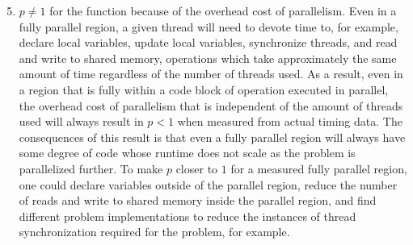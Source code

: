 \documentclass[11pt]{article}
\begin{document}
\begin{enumerate}[leftmargin=0.9in]
\begin{enumerate}[leftmargin=0.3in]
      \setcounter{enumii}{4}    
  \item $p \neq 1$ for the function  because of the overhead cost of parallelism. Even in a fully parallel region, a given thread will need to devote time to, for example, declare local variables, update local variables, synchronize threads, and read and write to shared memory, operations which take approximately the same amount of time regardless of the number of threads used. As a result, even in a region that is fully within a code block of operation executed in parallel, the overhead cost of parallelism that is independent of the amount of threads used will always result in $p < 1$ when measured from actual timing data. The consequences of this result is that even a fully parallel region will always have some degree of code whose runtime does not scale as the problem is parallelized further. To make $p$ closer to $1$ for a measured fully parallel region, one could declare variables outside of the parallel region, reduce the number of reads and write to shared memory inside the parallel region, and find different problem implementations to reduce the instances of thread synchronization required for the problem, for example.

  \end{enumerate}

\end{enumerate} %
\end{document}
